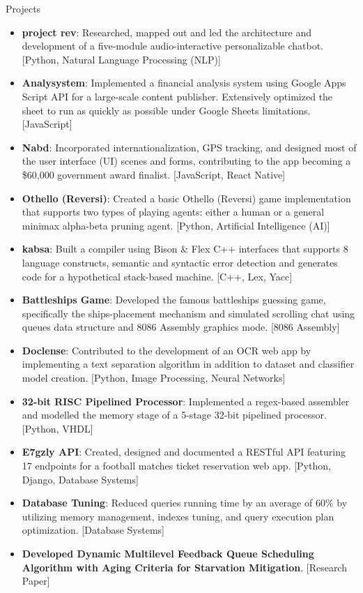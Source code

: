 \documentclass[]{mcdowellcv}
\begin{document}
	\begin{cvsection}{Projects}
		\begin{cvsubsection}{}{}{}
			\begin{itemize}
				\item \textbf{project rev}: Researched, mapped out and led the architecture and development of a five-module audio-interactive personalizable chatbot. [Python, Natural Language Processing (NLP)]
				\item \textbf{Analysystem}: Implemented a financial analysis system using Google Apps Script API for a large-scale content publisher. Extensively optimized the sheet to run as quickly as possible under Google Sheets limitations. [JavaScript]
				\item \textbf{Nabd}: Incorporated internationalization, GPS tracking, and designed most of the user interface (UI) scenes and forms, contributing to the app becoming a \$60,000 government award finalist. [JavaScript, React Native]
				\item \textbf{Othello (Reversi)}: Created a basic Othello (Reversi) game implementation that supports two types of playing agents: either a human or a general minimax alpha-beta pruning agent. [Python, Artificial Intelligence (AI)]
				\item \textbf{kabsa}: Built a compiler using Bison \& Flex C++ interfaces that supports 8 language constructs, semantic and syntactic error detection and generates code for a hypothetical stack-based machine. [C++, Lex, Yacc]
				\item \textbf{Battleships Game}: Developed the famous battleships guessing game, specifically the ships-placement mechanism and simulated scrolling chat using queues data structure and 8086 Assembly graphics mode. [8086 Assembly]
				\item \textbf{Doclense}: Contributed to the development of an OCR web app by implementing a text separation algorithm in addition to dataset and classifier model creation. [Python, Image Processing, Neural Networks]
				\item \textbf{32-bit RISC Pipelined Processor}: Implemented a regex-based assembler and modelled the memory stage of a 5-stage 32-bit pipelined processor. [Python, VHDL]
				\item \textbf{E7gzly API}: Created, designed and documented a RESTful API featuring 17 endpoints for a football matches ticket reservation web app. [Python, Django, Database Systems]
				\item \textbf{Database Tuning}: Reduced queries running time by an average of 60\% by utilizing memory management, indexes tuning, and query execution plan optimization. [Database Systems]
				\item \textbf{Developed Dynamic Multilevel Feedback Queue Scheduling Algorithm with Aging Criteria for Starvation Mitigation}. [Research Paper]
			\end{itemize}
		\end{cvsubsection}
	\end{cvsection}
\end{document}
